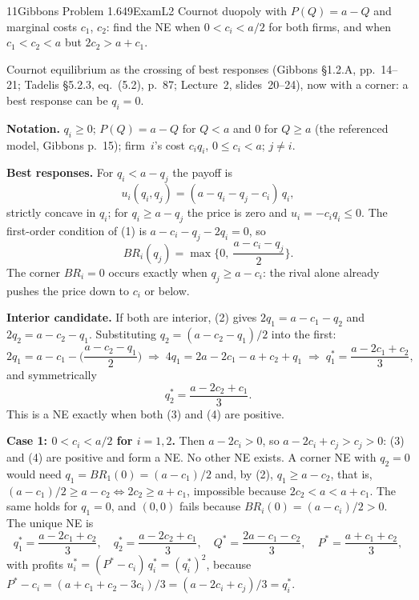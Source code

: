 \begin{exsol}{11}{Gibbons Problem 1.6}{49}{Exam}{L2}
\asked Cournot duopoly with $P(Q) = a - Q$ and marginal costs $c_1$, $c_2$: find the NE when
$0 < c_i < a/2$ for both firms, and when $c_1 < c_2 < a$ but $2c_2 > a + c_1$.

\method Cournot equilibrium as the crossing of best responses (Gibbons \S1.2.A, pp.~14--21;
Tadelis \S5.2.3, eq.~(5.2), p.~87; Lecture~2, slides~20--24), now with a corner: a best response
can be $q_i = 0$.

\solution
\textbf{Notation.} $q_i \ge 0$; $P(Q) = a - Q$ for $Q < a$ and $0$ for $Q \ge a$ (the referenced
model, Gibbons p.~15); firm~$i$'s cost $c_i q_i$, $0 \le c_i < a$; $j \ne i$.

\textbf{Best responses.} For $q_i < a - q_j$ the payoff is
\[
  u_i(q_i, q_j) = (a - q_i - q_j - c_i)\,q_i , \tag{1}
\]
strictly concave in $q_i$; for $q_i \ge a - q_j$ the price is zero and $u_i = -c_i q_i \le 0$. The
first-order condition of (1) is $a - c_i - q_j - 2q_i = 0$, so
\[
  BR_i(q_j) = \max\Big\{0,\ \frac{a - c_i - q_j}{2}\Big\}. \tag{2}
\]
The corner $BR_i = 0$ occurs exactly when $q_j \ge a - c_i$: the rival alone already pushes the
price down to $c_i$ or below.

\textbf{Interior candidate.} If both are interior, (2) gives
$2q_1 = a - c_1 - q_2$ and $2q_2 = a - c_2 - q_1$. Substituting $q_2 = (a - c_2 - q_1)/2$ into the
first:
\[
  2q_1 = a - c_1 - \Big(\frac{a - c_2 - q_1}{2}\Big)
  \;\Longrightarrow\; 4q_1 = 2a - 2c_1 - a + c_2 + q_1
  \;\Longrightarrow\; q_1^* = \frac{a - 2c_1 + c_2}{3}, \tag{3}
\]
and symmetrically
\[
  q_2^* = \frac{a - 2c_2 + c_1}{3}. \tag{4}
\]
This is a NE exactly when both (3) and (4) are positive.

\textbf{Case 1: $0 < c_i < a/2$ for $i = 1,2$.} Then $a - 2c_i > 0$, so
$a - 2c_i + c_j > c_j > 0$: (3) and (4) are positive and form a NE. No other NE exists. A corner
NE with $q_2 = 0$ would need $q_1 = BR_1(0) = (a - c_1)/2$ and, by (2), $q_1 \ge a - c_2$, that is,
$(a - c_1)/2 \ge a - c_2 \iff 2c_2 \ge a + c_1$, impossible because $2c_2 < a < a + c_1$. The same
holds for $q_1 = 0$, and $(0,0)$ fails because $BR_i(0) = (a - c_i)/2 > 0$. The unique NE is
\[
  q_1^* = \frac{a - 2c_1 + c_2}{3}, \quad q_2^* = \frac{a - 2c_2 + c_1}{3}, \quad
  Q^* = \frac{2a - c_1 - c_2}{3}, \quad P^* = \frac{a + c_1 + c_2}{3},
\]
with profits $u_i^* = (P^* - c_i)\,q_i^* = (q_i^*)^2$, because
$P^* - c_i = (a + c_1 + c_2 - 3c_i)/3 = (a - 2c_i + c_j)/3 = q_i^*$.


\end{exsol}
